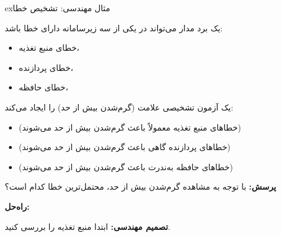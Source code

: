 \begin{PSbox}[unbreakable]{ex}{مثال مهندسی: تشخیص خطا}

یک برد مدار می‌تواند در یکی از سه زیرسامانه دارای خطا باشد:

\begin{itemize}
\tightlist
\item
   خطای منبع تغذیه، 
\item
   خطای پردازنده، 
\item
   خطای حافظه، 
\end{itemize}

یک آزمون تشخیصی علامت  (گرم‌شدن بیش از حد) را ایجاد می‌کند:

\begin{itemize}
\tightlist
\item
   (خطاهای منبع تغذیه معمولاً باعث گرم‌شدن بیش از حد می‌شوند)
\item
   (خطاهای پردازنده گاهی باعث گرم‌شدن بیش از حد می‌شوند)
\item
   (خطاهای حافظه به‌ندرت باعث گرم‌شدن بیش از حد می‌شوند)
\end{itemize}

\textbf{پرسش:} با توجه به مشاهده گرم‌شدن بیش از حد، محتمل‌ترین خطا کدام است؟

\textbf{راه‌حل:}

\PSbr{}\PSbr{}

\PSbr{}\PSbr{}

\textbf{تصمیم مهندسی:} ابتدا منبع تغذیه را بررسی کنید.

\end{PSbox}

